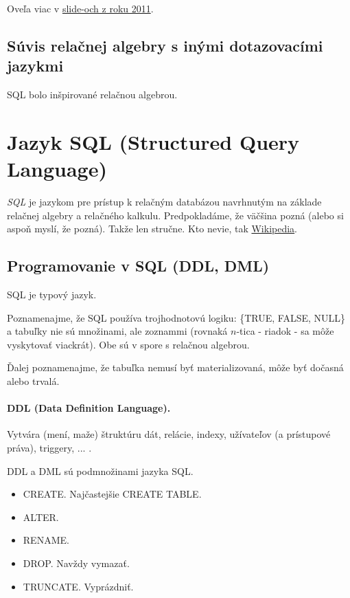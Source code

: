 \documentclass[10pt,a4paper]{article}
\begin{document}
Oveľa viac v \href{http://www.dcs.fmph.uniba.sk/~plachetk/TEACHING/DB2011/db2011_5.pdf}{slide-och z roku 2011}.


\subsection{Súvis relačnej algebry s inými dotazovacími jazykmi}
\label{relacna_algebra_suvis}

SQL bolo inšpirované relačnou algebrou. 
    
\section{Jazyk SQL (Structured Query Language)} 
\emph{SQL} je jazykom pre prístup k relačným databázou navrhnutým na základe relačnej algebry a relačného kalkulu. 
Predpokladáme, že väčšina pozná (alebo si aspoň myslí, že pozná). Takže len stručne. 
Kto nevie, tak \href{http://en.wikipedia.org/wiki/SQL}{Wikipedia}. 

\subsection{Programovanie v SQL (DDL, DML)}

SQL je typový jazyk.

Poznamenajme, že SQL používa trojhodnotovú logiku: \{TRUE, FALSE, NULL\}
a tabuľky nie sú množinami, ale zoznammi (rovnaká $n$-tica - riadok - sa môže vyskytovať viackrát). Obe sú v spore s relačnou algebrou. 

Ďalej poznamenajme, že tabuľka nemusí byť materializovaná, môže byť dočasná alebo trvalá. 

\paragraph{DDL (Data Definition Language).}
Vytvára (mení, maže) štruktúru dát, relácie, indexy, užívateľov (a prístupové práva), triggery, ... . 

DDL a DML sú podmnožinami jazyka SQL. 

\begin{itemize}
\item CREATE. Najčastejšie CREATE TABLE.
\item ALTER. 
\item RENAME.
\item DROP. Navždy vymazať. 
\item TRUNCATE. Vyprázdniť. 
\end{itemize}
\end{document}
